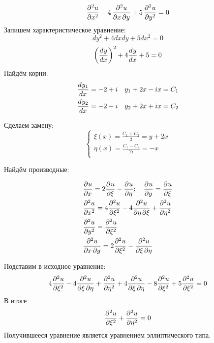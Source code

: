 		\[\derp{u}{x}{2} - 4\, \derps{u}{x}{y} + 5\, \derp{u}{y}{2} = 0\]
		Запишем характеристическое уравнение:\\
		\[dy^2 + 4 dx dy + 5 dx^2 = 0\]
		\[\left(\der{y}{x}{} \right)^2 + 4 \der{y}{x}{} + 5 = 0\]
		Найдём корни:
		\begin{align*}
		    \der{y_1}{x}{} = -2 + i \quad y_1 + 2x - ix =C_1\\
		    \der{y_2}{x}{} = -2 - i \quad y_2 + 2x + ix =C_2\\
		\end{align*}

		Сделаем замену:
		\[\begin{cases}
		    \xi(x) = \frac{C_1 + C_2}{2} = y + 2x\\
		    \eta(x) = \frac{C_1 - C_2}{2i} = - x\\
		\end{cases}\]

		Найдём производные:
		
		\begin{align*}
		    &\derp{u}{x}{}=  2 \derp{u}{\xi}{}- \derp{u}{\eta}{}; \quad \derp{u}{y}{} = \derp{u}{\xi}{}\\
		    &\derp{u}{x}{2} =   4 \derp{u}{\xi}{2} - 4 \derps{u}{\eta}{\xi} + \derp{u}{\eta}{2}\\
		    &\derp{u}{y}{2} =  \derp{u}{\xi}{2}\\
		    &\derps{u}{x}{y} = 2\derp{u}{\xi}{2} - \derps{u}{\xi}{\eta}\\
		\end{align*}
		
		Подставим в исходное уравнение:
		\[4 \derp{u}{\xi}{2} - 4 \derps{u}{\xi}{\eta} + \derp{u}{\eta}{2} + 4 \derps{u}{\xi}{\eta} - 8 \derp{u}{\xi}{2}  + 5 \derp{u}{\xi}{2}  = 0\]
		В итоге
		\[ \derp{u}{\xi}{2} + \derp{u}{\eta}2{} = 0\]
Получившееся уравнение является уравнением эллиптического типа.